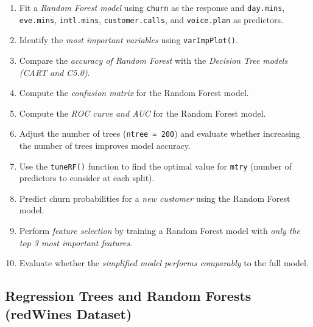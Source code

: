 \documentclass[
  11pt,
]{book}
\newcommand{\passthrough}[1]{#1}
\providecommand{\tightlist}{%
  \setlength{\itemsep}{0pt}\setlength{\parskip}{0pt}}
\theoremstyle{definition}
\theoremstyle{definition}
\theoremstyle{definition}
\theoremstyle{definition}
\theoremstyle{remark}
\begin{document}
\begin{enumerate}
\def\labelenumi{\arabic{enumi}.}
\setcounter{enumi}{27}
\tightlist
\item
  Fit a \emph{Random Forest model} using \passthrough{\lstinline!churn!} as the response and \passthrough{\lstinline!day.mins!}, \passthrough{\lstinline!eve.mins!}, \passthrough{\lstinline!intl.mins!}, \passthrough{\lstinline!customer.calls!}, and \passthrough{\lstinline!voice.plan!} as predictors.\\
\item
  Identify the \emph{most important variables} using \passthrough{\lstinline!varImpPlot()!}.\\
\item
  Compare the \emph{accuracy of Random Forest} with the \emph{Decision Tree models (CART and C5.0)}.\\
\item
  Compute the \emph{confusion matrix} for the Random Forest model.\\
\item
  Compute the \emph{ROC curve and AUC} for the Random Forest model.\\
\item
  Adjust the number of trees (\passthrough{\lstinline!ntree = 200!}) and evaluate whether increasing the number of trees improves model accuracy.\\
\item
  Use the \passthrough{\lstinline!tuneRF()!} function to find the optimal value for \passthrough{\lstinline!mtry!} (number of predictors to consider at each split).\\
\item
  Predict churn probabilities for a \emph{new customer} using the Random Forest model.\\
\item
  Perform \emph{feature selection} by training a Random Forest model with \emph{only the top 3 most important features}.\\
\item
  Evaluate whether the \emph{simplified model performs comparably} to the full model.
\end{enumerate}

\subsection*{Regression Trees and Random Forests (redWines Dataset)}\label{regression-trees-and-random-forests-redwines-dataset}
\end{document}
